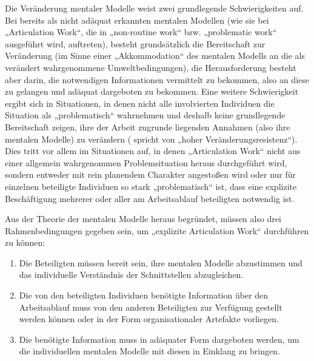 Die Veränderung mentaler Modelle weist zwei grundlegende Schwierigkeiten auf. Bei bereits als nicht adäquat erkannten mentalen Modellen (wie sie bei „Articulation Work“, die in „non-routine work“ bzw. „problematic work“ ausgeführt wird, auftreten), besteht grundsätzlich die Bereitschaft zur Veränderung (im Sinne einer „Akkommodation“ des mentalen Modells an die als verändert wahrgenommene Umweltbedingungen), die Herausforderung besteht aber darin, die notwendigen Informationen vermittelt zu bekommen, also an diese zu gelangen und adäquat dargeboten zu bekommen. Eine weitere Schwierigkeit ergibt sich in Situationen, in denen nicht alle involvierten Individuen die Situation als „problematisch“ wahrnehmen und deshalb keine grundlegende Bereitschaft zeigen, ihre der Arbeit zugrunde liegenden Annahmen (also ihre mentalen Modelle) zu verändern (\citet{Ifenthaler06} spricht von „hoher Veränderungsresistenz“). Dies tritt vor allem im Situationen auf, in denen „Articulation Work“ nicht aus einer allgemein wahrgenommen Problemsituation heraus durchgeführt wird, sondern entweder mit rein planendem Charakter angestoßen wird oder nur für einzelnen beteiligte Individuen so stark „problematisch“ ist, dass eine explizite Beschäftigung mehrerer oder aller am Arbeitsablauf beteiligten notwendig ist. 

Aus der Theorie der mentalen Modelle heraus begründet, müssen also drei Rahmenbedingungen gegeben sein, um „explizite Articulation Work“ durchführen zu können:
\begin{enumerate}
	\item Die Beteiligten müssen bereit sein, ihre mentalen Modelle abzustimmen und das individuelle Verständnis der Schnittstellen abzugleichen.
	\item Die von den beteiligten Individuen benötigte Information über den Arbeitsablauf muss von den anderen Beteiligten zur Verfügung gestellt werden können oder in der Form organisationaler Artefakte vorliegen.
	\item Die benötigte Information muss in adäquater Form dargeboten werden, um  die individuellen mentalen Modelle mit diesen in Einklang zu bringen.
\end{enumerate}

